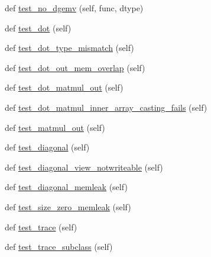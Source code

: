 \begin{DoxyCompactItemize}
\item 
def \hyperlink{classnumpy_1_1core_1_1tests_1_1test__multiarray_1_1TestMethods_a7761e2a73f731fe6e68cb6c471cfe117}{test\+\_\+no\+\_\+dgemv} (self, func, dtype)
\item 
def \hyperlink{classnumpy_1_1core_1_1tests_1_1test__multiarray_1_1TestMethods_a1f9cbd57e931afdc3442b224a946f14d}{test\+\_\+dot} (self)
\item 
def \hyperlink{classnumpy_1_1core_1_1tests_1_1test__multiarray_1_1TestMethods_a9f5f6f6c804e755f3fd933447f21f90c}{test\+\_\+dot\+\_\+type\+\_\+mismatch} (self)
\item 
def \hyperlink{classnumpy_1_1core_1_1tests_1_1test__multiarray_1_1TestMethods_aa28582ad3be77a745325b596c55d2cf5}{test\+\_\+dot\+\_\+out\+\_\+mem\+\_\+overlap} (self)
\item 
def \hyperlink{classnumpy_1_1core_1_1tests_1_1test__multiarray_1_1TestMethods_a3dcc99efe77e2318eb7307aef4cff0ea}{test\+\_\+dot\+\_\+matmul\+\_\+out} (self)
\item 
def \hyperlink{classnumpy_1_1core_1_1tests_1_1test__multiarray_1_1TestMethods_a7a5003c6e6fad21d06d76526874ab291}{test\+\_\+dot\+\_\+matmul\+\_\+inner\+\_\+array\+\_\+casting\+\_\+fails} (self)
\item 
def \hyperlink{classnumpy_1_1core_1_1tests_1_1test__multiarray_1_1TestMethods_a2b172ce8052e9becfb2b36a291bd7632}{test\+\_\+matmul\+\_\+out} (self)
\item 
def \hyperlink{classnumpy_1_1core_1_1tests_1_1test__multiarray_1_1TestMethods_ab96cd51cc382a59978c119a8391c31ba}{test\+\_\+diagonal} (self)
\item 
def \hyperlink{classnumpy_1_1core_1_1tests_1_1test__multiarray_1_1TestMethods_a82e4193e6060a9424d40d5da5f879600}{test\+\_\+diagonal\+\_\+view\+\_\+notwriteable} (self)
\item 
def \hyperlink{classnumpy_1_1core_1_1tests_1_1test__multiarray_1_1TestMethods_acfb760d02fabafc4f500909789b6e1de}{test\+\_\+diagonal\+\_\+memleak} (self)
\item 
def \hyperlink{classnumpy_1_1core_1_1tests_1_1test__multiarray_1_1TestMethods_aea876185bc659c195ec30fc938e8d472}{test\+\_\+size\+\_\+zero\+\_\+memleak} (self)
\item 
def \hyperlink{classnumpy_1_1core_1_1tests_1_1test__multiarray_1_1TestMethods_a5bc3a463d2e960a10da4491221b388da}{test\+\_\+trace} (self)
\item 
def \hyperlink{classnumpy_1_1core_1_1tests_1_1test__multiarray_1_1TestMethods_a1d76482d10807aeb822c183505d02d68}{test\+\_\+trace\+\_\+subclass} (self)

\end{DoxyCompactItemize}
